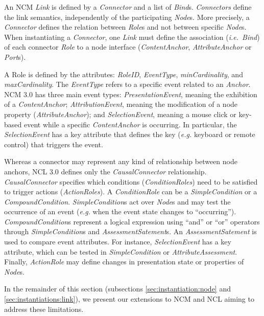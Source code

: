 An NCM \textit{Link} is defined by a \textit{Connector} and a list of
\textit{Bind}s.
\textit{Connectors} define the link semantics, independently of the
participating \textit{Node}s.
More precisely, a \textit{Connector} defines the relation between
\textit{Role}s and not between specific \textit{Node}s. When instantiating a
\textit{Connector}, one \textit{Link} must define the association
(\textit{i.e.}~\textit{Bind}) of each connector \textit{Role} to
a node interface (\textit{ContentAnchor}, \textit{AttributeAnchor} or
\textit{Port}s).

A Role is defined by the attributes: \textit{RoleID}, \textit{EventType},
\textit{minCardinality}, and
\textit{maxCardinality}. The \textit{EventType} refers to a specific event
related to an \textit{Anchor}. NCM 3.0 has three main event types:
\textit{PresentationEvent}, meaning the exhibition of a \textit{ContentAnchor};
\textit{AttributionEvent}, meaning the modification of a node property
(\textit{AttributeAnchor}); and \textit{SelectionEvent}, meaning a mouse click
or key-based event while a specific \textit{ContentAnchor} is occurring. In
particular, the \textit{SelectionEvent} has a key attribute that defines the
key (\textit{e.g.} keyboard or remote control) that triggers the event.

Whereas a connector may represent any kind of relationship between node anchors,
NCL 3.0 defines only the \textit{CausalConnector} relationship.
\textit{CausalConnector} specifies which conditions (\textit{ConditionRoles})
need to be satisfied to trigger actions (\textit{ActionRoles}). A
\textit{ConditionRole} can be a \textit{SimpleCondition} or a
\textit{CompoundCondition}. \textit{SimpleCondition}s act over \textit{Node}s
and may test the occurrence of an event (\textit{e.g.} when the event state
changes to “occurring”). \textit{CompoundCondition}s represent a logical
expression using “and” or “or” operators through \textit{SimpleCondition}s and
\textit{AssessmentSatement}s. An \textit{AssessmentSatement} is used to compare
event attributes. For instance, \textit{SelectionEvent} has a key attribute,
which can be tested in \textit{SimpleCondition} or
\textit{AttributeAssessment}. Finally, \textit{ActionRole} may define changes
in presentation state or properties of \textit{Node}s.

In the remainder of this section (subsections \ref{sec:instantiation:node}
and \ref{sec:instantiations:link}), we present our extensions to NCM and NCL
aiming to address these limitations.


